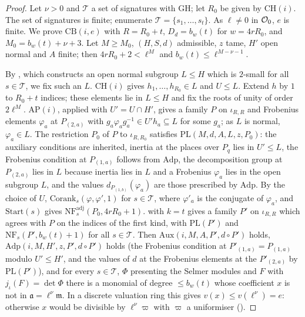 \begin{proof}
Let $\nu>0$ and $\mathcal T$ a set of signatures with $\mathrm{GH}$; let $R_0$ be given by $\mathrm{CH}(i)$. The set of
signatures is finite; enumerate $\mathcal T=\{s_1,\dots,s_t\}$. As $\ell\ne0$ in $\mathcal O_0$, $e$ is finite. We prove
$\mathrm{CB}(i,e)$ with $R=R_0+t$, $D_d=b_w(t)$ for $w=4rR_0$, and $M_0=b_w(t)+\nu+3$. Let $M\ge M_0$, $(H,S,d)$ admissible, $z$
tame, $H'$ open normal and $A$ finite; then $4rR_0+2<\ell^M$ and $b_w(t)\le\ell^{M-\nu-1}$.

By , which constructs an open normal subgroup $L\le H$ which is
$2$-small for all $s\in\mathcal T$, we fix such an $L$. $\mathrm{CH}(i)$ gives $h_1,\dots,h_{R_0}\in L$ and $U\le L$. Extend
$h$ by $1$ to $R_0+t$ indices; these elements lie in $L\le H$ and fix the roots of unity of order $2\ell^M$.
$\mathrm{AP}(i)$, applied with $U'=U\cap H'$, gives a family $P$ on $\iota_{R,R}$ and Frobenius elements $\varphi_a$ at
$P_{(2,a)}$ with $g_a\varphi_ag_a^{-1}\in U'h_a\subseteq L$ for some $g_a$; as $L$ is normal, $\varphi_a\in L$. The restriction $P_0$ of
$P$ to $\iota_{R,R_0}$ satisfies $\mathrm{PL}(M,d,A,L,z,P_0)$: the auxiliary conditions are inherited, inertia at the places over
$P_q$ lies in $U'\le L$, the Frobenius condition at $P_{(1,a)}$ follows from $\mathrm{Adp}$, the decomposition group at
$P_{(2,a)}$ lies in $L$ because inertia lies in $L$ and a Frobenius $\varphi_a$ lies in the open subgroup $L$, and the values
$d_{P_{(1,b)}}(\varphi_a)$ are those prescribed by $\mathrm{Adp}$. By the choice of $U$, $\mathrm{Corank}_s(\varphi,\varphi',1)$ for
$s\in\mathcal T$, where $\varphi'_a$ is the conjugate of $\varphi_a$, and $\mathrm{Start}(s)$ gives $\mathrm{NF}^{\mathrm{adj}}_s(P_0,4rR_0+1)$.
 with $k=t$ gives a family $P'$ on $\iota_{R,R}$ which agrees with $P$ on the indices of the first
kind, with $\mathrm{PL}(P')$ and $\mathrm{NF}_s(P',b_w(t)+1)$ for all $s\in\mathcal T$. Then $\mathrm{Aux}(i,M,A,P',d\circ P')$ holds,
$\mathrm{Adp}(i,M,H',z,P',d\circ P')$ holds (the Frobenius condition at $P'_{(1,a)}=P_{(1,a)}$ modulo $U'\le H'$, and the values of
$d$ at the Frobenius elements at the $P'_{(2,a)}$ by $\mathrm{PL}(P')$), and for every $s\in\mathcal T$, $\Phi$ presenting the
Selmer modules and $F$ with $j_\iota(F)=\det\Phi$ there is a monomial of degree $\le b_w(t)$ whose coefficient $x$ is not in
$\mathfrak a=\ell^\nu\mathfrak m$. In a discrete valuation ring this gives $v(x)\le v(\ell^\nu)=e$: otherwise $x$ would be
divisible by $\ell^\nu\varpi$ with $\varpi$ a uniformiser
().
\end{proof}

